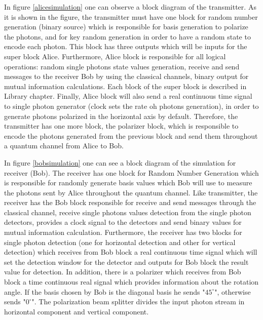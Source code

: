 \begin{refsection}
    In figure \ref{alicesimulation} one can observe a block diagram of the transmitter. As it is shown in the figure, the transmitter must have one block for random number generation (binary source) which is responsible for basis generation to polarize the photons, and for key random generation in order to have a random state to encode each photon. This block has three outputs which will be inputs for the super block Alice. Furthermore, Alice block is responsible for all logical operations: random single photons state values generation, receive and send messages to the receiver Bob by using the classical channels, binary output for mutual information calculations. Each block of the super block is described in Library chapter. Finally, Alice block will also send a real continuous time signal to single photon generator (clock sets the rate oh photons generation), in order to generate photons polarized in the horizontal axis by default. Therefore, the transmitter has one more block, the polarizer block, which is responsible to encode the photons generated from the previous block and send them throughout a quantum channel from Alice to Bob.

     In figure \ref{bobsimulation} one can see a block diagram of the simulation for receiver (Bob). The receiver has one block for Random Number Generation which is responsible for randomly generate basis values which Bob will use to measure the photons sent by Alice throughout the quantum channel. Like transmitter, the receiver has the Bob block responsible for receive and send messages through the classical channel, receive single photons values detection from the single photon detectors, provides a clock signal to the detectors and send binary values for mutual information calculation. Furthermore, the receiver has two blocks for single photon detection (one for horizontal detection and other for vertical detection) which receives from Bob block a real continuous time signal which will set the detection window for the detector and outputs for Bob block the result value for detection. In addition, there is a polarizer which receives from Bob block a time continuous real signal which provides information about the rotation angle. If the basis chosen by Bob is the diagonal basis he sends "$45^\circ$", otherwise sends "$0^\circ$". The polarization beam splitter divides the input photon stream in horizontal component and vertical component.





\end{refsection}
